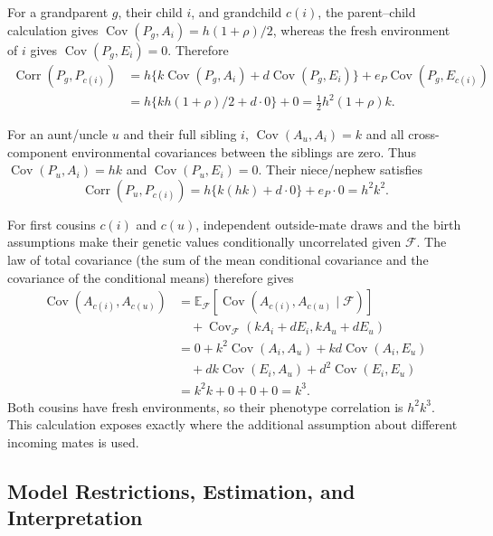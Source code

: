 For a grandparent $g$, their child $i$, and grandchild $c(i)$, the
parent--child calculation gives
$\operatorname{Cov}(P_g,A_i)=h(1+\rho)/2$, whereas the fresh environment
of $i$ gives $\operatorname{Cov}(P_g,E_i)=0$. Therefore
\begin{align*}
 \operatorname{Corr}(P_g,P_{c(i)})
 &=h\{k\operatorname{Cov}(P_g,A_i)
       +d\operatorname{Cov}(P_g,E_i)\}
       +e_P\operatorname{Cov}(P_g,E_{c(i)})\\
 &=h\{kh(1+\rho)/2+d\cdot0\}+0
   =\boxed{\tfrac12h^2(1+\rho)k}.
\end{align*}

For an aunt/uncle $u$ and their full sibling $i$,
$\operatorname{Cov}(A_u,A_i)=k$ and all cross-component environmental
covariances between the siblings are zero. Thus
$\operatorname{Cov}(P_u,A_i)=hk$ and
$\operatorname{Cov}(P_u,E_i)=0$. Their niece/nephew satisfies
\[
 \operatorname{Corr}(P_u,P_{c(i)})
 =h\{k(hk)+d\cdot0\}+e_P\cdot0=\boxed{h^2k^2}.
\]

For first cousins $c(i)$ and $c(u)$, independent outside-mate draws
and the birth assumptions make their genetic values conditionally
uncorrelated given $\mathcal F$. The law of total covariance
(the sum of the mean conditional covariance and the covariance of
the conditional means) therefore gives
\begin{align*}
 \operatorname{Cov}(A_{c(i)},A_{c(u)})
 &=\mathbb E_{\mathcal F}
       [\operatorname{Cov}(A_{c(i)},A_{c(u)}\mid\mathcal F)]\\
 &\quad+\operatorname{Cov}_{\mathcal F}(kA_i+dE_i,kA_u+dE_u)\\
 &=0+k^2\operatorname{Cov}(A_i,A_u)
   +kd\operatorname{Cov}(A_i,E_u)\\
 &\quad+dk\operatorname{Cov}(E_i,A_u)
   +d^2\operatorname{Cov}(E_i,E_u)\\
 &=k^2k+0+0+0=k^3.
\end{align*}
Both cousins have fresh environments, so their phenotype correlation is
$\boxed{h^2k^3}$. This calculation exposes exactly where the additional
assumption about different incoming mates is used.

\subsection{Model Restrictions, Estimation, and Interpretation}
\label{sec:model-tests}

